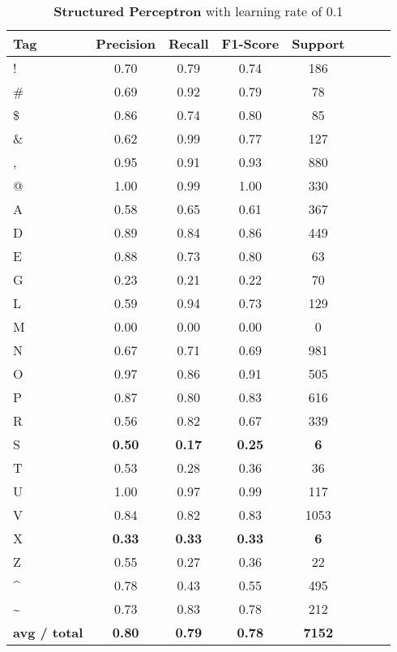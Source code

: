 \documentclass[11pt]{article}
\begin{document}
\begin{table}[htbp]
\centering
\begin{tabular}{l*{6}{c}r}
Tag              & Precision & Recall & F1-Score & Support \\
\hline
			!  &     0.70  &    0.79   &   0.74   &    186 \\
          \#   &    0.69    &  0.92  &    0.79    &    78 \\
          \$   &    0.86    &  0.74   &   0.80    &    85 \\
          \&   &    0.62   &   0.99  &    0.77   &    127 \\
          ,     &  0.95   &   0.91  &    0.93   &    880 \\
          @   &    1.00   &   0.99  &    1.00    &   330 \\
          A     &  0.58  &    0.65  &    0.61  &     367 \\
          D     &  0.89   &   0.84   &   0.86   &    449 \\
          E    &   0.88  &    0.73   &   0.80  &      63 \\
          G   &    0.23  &    0.21   &   0.22    &    70 \\
          L   &    0.59  &    0.94   &   0.73    &   129 \\
          M    &   0.00   &   0.00  &    0.00    &     0 \\
          N    &   0.67 &     0.71   &   0.69   &    981 \\
          O    &   0.97   &   0.86  &    0.91   &    505 \\
          P   &    0.87 &     0.80  &    0.83   &    616 \\
          R   &    0.56   &   0.82  &    0.67  &     339 \\
          S    &   \textbf{0.50}  &    \textbf{0.17}   &   \textbf{0.25}   &      \textbf{6} \\
          T    &   0.53  &    0.28  &    0.36   &     36 \\
          U    &   1.00  &    0.97   &   0.99    &   117 \\
          V   &    0.84  &    0.82     & 0.83    &  1053 \\
          X    &   \textbf{0.33}  &    \textbf{0.33}  &    \textbf{0.33}    &     \textbf{6 }\\
          Z   &    0.55   &   0.27 &     0.36  &       22 \\
          \textasciicircum  &    0.78  &    0.43   &   0.55    &   495 \\
          \textasciitilde   &    0.73  &    0.83   &   0.78   &    212 \\
          \textbf{avg / total}     &  \textbf{0.80}   &   \textbf{0.79}   &   \textbf{0.78}   &  \textbf{ 7152} \\
          \end{tabular}
       \caption{ \textbf{Structured Perceptron }with learning rate of 0.1}
\label{table1}
\end{table}
\end{document}
